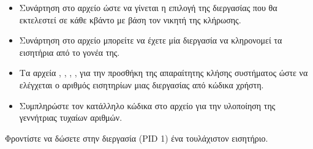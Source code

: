 \documentclass[18pt]{extarticle}
\begin{document}
\begin{question}
\begin{info}[Βοήθεια:]
        \begin{itemize}
            \item Συνάρτηση  στο αρχείο  ώστε να γίνεται η επιλογή της διεργασίας που θα εκτελεστεί σε κάθε κβάντο με βάση τον νικητή της κλήρωσης.
            \item Συνάρτηση  στο αρχείο  μπορείτε να έχετε μία διεργασία να κληρονομεί τα εισητήρια από το γονέα της.
            \item Τα αρχεία , , , ,  
                για την προσθήκη της απαραίτητης κλήσης συστήματος ώστε να ελέγχεται ο αριθμός εισητηρίων μιας διεργασίας από κώδικα χρήστη.
            \item Συμπληρώστε τον κατάλληλο κώδικα στο αρχείο  για την υλοποίηση της γεννήτριας τυχαίων αριθμών.
        \end{itemize}

        Φροντίστε να δώσετε στην διεργασία  (PID 1) ένα τουλάχιστον εισητήριο.
    \end{info}

\end{question}

\printbibliography
\end{document}
